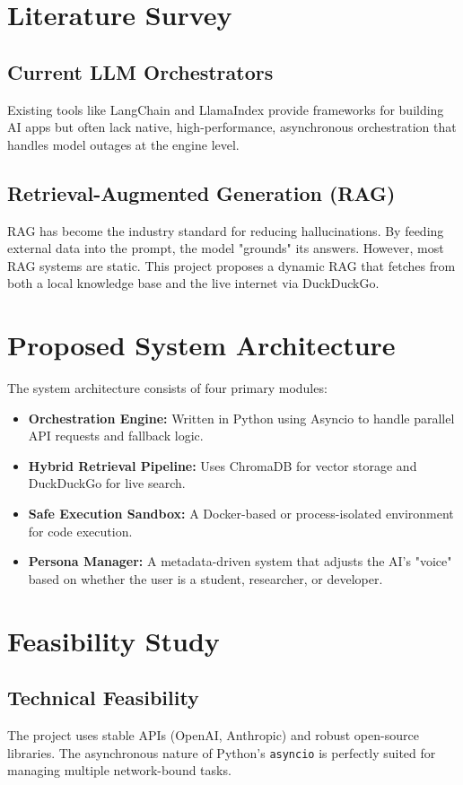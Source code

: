 \documentclass[12pt, a4paper]{report}
\begin{document}
\section{Literature Survey}
\subsection{Current LLM Orchestrators}
Existing tools like LangChain and LlamaIndex provide frameworks for building AI apps but often lack native, high-performance, asynchronous orchestration that handles model outages at the engine level. 

\subsection{Retrieval-Augmented Generation (RAG)}
RAG has become the industry standard for reducing hallucinations. By feeding external data into the prompt, the model "grounds" its answers. However, most RAG systems are static. This project proposes a dynamic RAG that fetches from both a local knowledge base and the live internet via DuckDuckGo.

\section{Proposed System Architecture}
The system architecture consists of four primary modules:
\begin{itemize}
    \item \textbf{Orchestration Engine:} Written in Python using Asyncio to handle parallel API requests and fallback logic.
    \item \textbf{Hybrid Retrieval Pipeline:} Uses ChromaDB for vector storage and DuckDuckGo for live search.
    \item \textbf{Safe Execution Sandbox:} A Docker-based or process-isolated environment for code execution.
    \item \textbf{Persona Manager:} A metadata-driven system that adjusts the AI's "voice" based on whether the user is a student, researcher, or developer.
\end{itemize}

\section{Feasibility Study}
\subsection{Technical Feasibility}
The project uses stable APIs (OpenAI, Anthropic) and robust open-source libraries. The asynchronous nature of Python's \texttt{asyncio} is perfectly suited for managing multiple network-bound tasks.
\end{document}
